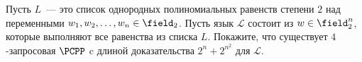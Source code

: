 Пусть $L$~--- это список однородных полиномиальных равенств степени $2$ над переменными
$w_1, w_2, \dots, w_n \in \field_2$. Пусть язык $\mathcal{L}$ состоит из $w \in \field_2^n$, которые
выполняют все равенства из списка $L$. Покажите, что существует $4$-запросовая $\PCPP$ c длиной
доказательства $2^n + 2^{n^2}$ для $\mathcal{L}$.
